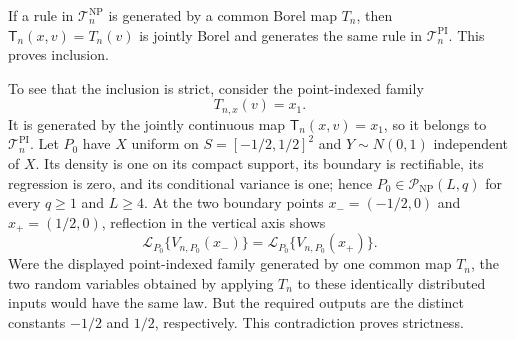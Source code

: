 If a rule in \(\mathcal T_n^{\mathrm{NP}}\) is generated by a common Borel map \(T_n\), then \(\mathsf T_n(x,v)=T_n(v)\) is jointly Borel and generates the same rule in \(\mathcal T_n^{\mathrm{PI}}\).  This proves inclusion.

To see that the inclusion is strict, consider the point-indexed family
\[
 T_{n,x}(v)=x_1.
\]
It is generated by the jointly continuous map \(\mathsf T_n(x,v)=x_1\), so it belongs to \(\mathcal T_n^{\mathrm{PI}}\).  Let \(P_0\) have \(X\) uniform on \(S=[-1/2,1/2]^2\) and \(Y\sim N(0,1)\) independent of \(X\).  Its density is one on its compact support, its boundary is rectifiable, its regression is zero, and its conditional variance is one; hence \(P_0\in\mathcal P_{\mathrm{NP}}(L,q)\) for every \(q\geq1\) and \(L\geq4\).  At the two boundary points \(x_-=(-1/2,0)\) and \(x_+=(1/2,0)\), reflection in the vertical axis shows
\[
 \mathcal L_{P_0}\{V_{n,P_0}(x_-)\}
 =\mathcal L_{P_0}\{V_{n,P_0}(x_+)\}.
\]
Were the displayed point-indexed family generated by one common map \(T_n\), the two random variables obtained by applying \(T_n\) to these identically distributed inputs would have the same law.  But the required outputs are the distinct constants \(-1/2\) and \(1/2\), respectively.  This contradiction proves strictness.